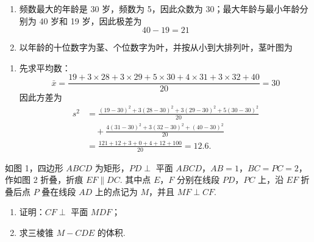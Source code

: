 \begin{solution}
\begin{enumerate}
\item 频数最大的年龄是 30 岁，频数为 5，因此众数为 \(30\)；最大年龄与最小年龄分别为 40 岁和 19 岁，因此极差为
\[
40-19=21
\]

\item 以年龄的十位数字为茎、个位数字为叶，并按从小到大排列叶，茎叶图为
\end{enumerate}
\begin{enumerate}[start=3]

\item 先求平均数：
\[
\bar{x}=\frac{19+3\times28+3\times29+5\times30+4\times31+3\times32+40}{20}=30
\]
因此方差为
\[
\begin{aligned}
s^2
&=\frac{(19-30)^2+3(28-30)^2+3(29-30)^2+5(30-30)^2}{20}\\
&\quad+\frac{4(31-30)^2+3(32-30)^2+(40-30)^2}{20}\\
&=\frac{121+12+3+0+4+12+100}{20}=12.6.
\end{aligned}
\]
\end{enumerate}
\end{solution}

\begin{problem}
如图 1，四边形 \(ABCD\) 为矩形，\(PD \perp\) 平面 \(ABCD\)，\(AB = 1\)，\(BC = PC = 2\)，作如图 2 折叠，折痕 \(EF \parallel DC\). 其中点 \(E\)，\(F\) 分别在线段 \(PD\)，\(PC\) 上，沿 \(EF\) 折叠后点 \(P\) 叠在线段 \(AD\) 上的点记为 \(M\)，并且 \(MF \perp CF\).

\begin{enumerate}
\item 证明：\(CF \perp\) 平面 \(MDF\)；
\item 求三棱锥 \(M-CDE\) 的体积.
\end{enumerate}

\end{problem}

